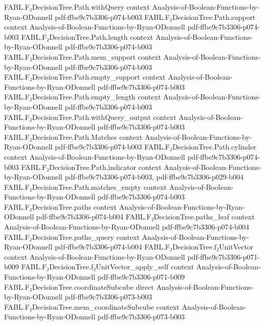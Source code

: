 \begin{theorem}
  {FABL.F₂DecisionTree.Path.withQuery}
  {context}
  {Analysis-of-Boolean-Functions-by-Ryan-ODonnell}
  {pdf-ffbe9c7b3306-p074-b003}
\proofstep
  {FABL.F₂DecisionTree.Path.support}
  {context}
  {Analysis-of-Boolean-Functions-by-Ryan-ODonnell}
  {pdf-ffbe9c7b3306-p074-b003}
\proofstep
  {FABL.F₂DecisionTree.Path.length}
  {context}
  {Analysis-of-Boolean-Functions-by-Ryan-ODonnell}
  {pdf-ffbe9c7b3306-p074-b003}
\proofstep
  {FABL.F₂DecisionTree.Path.mem_support}
  {context}
  {Analysis-of-Boolean-Functions-by-Ryan-ODonnell}
  {pdf-ffbe9c7b3306-p074-b003}
\proofstep
  {FABL.F₂DecisionTree.Path.empty_support}
  {context}
  {Analysis-of-Boolean-Functions-by-Ryan-ODonnell}
  {pdf-ffbe9c7b3306-p074-b003}
\proofstep
  {FABL.F₂DecisionTree.Path.empty_length}
  {context}
  {Analysis-of-Boolean-Functions-by-Ryan-ODonnell}
  {pdf-ffbe9c7b3306-p074-b003}
\proofstep
  {FABL.F₂DecisionTree.Path.withQuery_output}
  {context}
  {Analysis-of-Boolean-Functions-by-Ryan-ODonnell}
  {pdf-ffbe9c7b3306-p074-b003}
\proofstep
  {FABL.F₂DecisionTree.Path.Matches}
  {context}
  {Analysis-of-Boolean-Functions-by-Ryan-ODonnell}
  {pdf-ffbe9c7b3306-p074-b003}
\proofstep
  {FABL.F₂DecisionTree.Path.cylinder}
  {context}
  {Analysis-of-Boolean-Functions-by-Ryan-ODonnell}
  {pdf-ffbe9c7b3306-p074-b003}
\proofstep
  {FABL.F₂DecisionTree.Path.indicator}
  {context}
  {Analysis-of-Boolean-Functions-by-Ryan-ODonnell}
  {pdf-ffbe9c7b3306-p074-b003,
    pdf-ffbe9c7b3306-p029-b004}
\proofstep
  {FABL.F₂DecisionTree.Path.matches_empty}
  {context}
  {Analysis-of-Boolean-Functions-by-Ryan-ODonnell}
  {pdf-ffbe9c7b3306-p074-b003}
\proofstep
  {FABL.F₂DecisionTree.paths}
  {context}
  {Analysis-of-Boolean-Functions-by-Ryan-ODonnell}
  {pdf-ffbe9c7b3306-p074-b004}
\proofstep
  {FABL.F₂DecisionTree.paths_leaf}
  {context}
  {Analysis-of-Boolean-Functions-by-Ryan-ODonnell}
  {pdf-ffbe9c7b3306-p074-b004}
\proofstep
  {FABL.F₂DecisionTree.paths_query}
  {context}
  {Analysis-of-Boolean-Functions-by-Ryan-ODonnell}
  {pdf-ffbe9c7b3306-p074-b004}
\proofstep
  {FABL.F₂DecisionTree.f₂UnitVector}
  {context}
  {Analysis-of-Boolean-Functions-by-Ryan-ODonnell}
  {pdf-ffbe9c7b3306-p071-b009}
\proofstep
  {FABL.F₂DecisionTree.f₂UnitVector_apply_self}
  {context}
  {Analysis-of-Boolean-Functions-by-Ryan-ODonnell}
  {pdf-ffbe9c7b3306-p071-b009}
\proofstep
  {FABL.F₂DecisionTree.coordinateSubcube}
  {direct}
  {Analysis-of-Boolean-Functions-by-Ryan-ODonnell}
  {pdf-ffbe9c7b3306-p073-b003}
\proofstep
  {FABL.F₂DecisionTree.mem_coordinateSubcube}
  {context}
  {Analysis-of-Boolean-Functions-by-Ryan-ODonnell}
  {pdf-ffbe9c7b3306-p073-b003}

\end{theorem}
